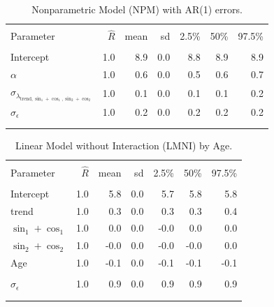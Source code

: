 \documentclass{article}\usepackage[]{graphicx}\usepackage[]{color}
\begin{document}
\begin{table}[bp!]
\caption{Nonparametric Model (NPM) with AR(1) errors.}
\label{npm_ar}
\centering
\begin{tabular}{lrrrrrr}
\\[-1.8ex]\hline 
\hline \\[-1.8ex] 
Parameter & $\hat{R}$  & mean & sd & 2.5\% & 50\% & 97.5\% \\ 
\hline \\[-1.8ex] 
Intercept & 1.0 & 8.9 & 0.0 & 8.8 & 8.9 & 8.9 \\ 
$\alpha$ & 1.0 & 0.6 & 0.0 & 0.5 & 0.6 & 0.7 \\ 
$\sigma_{\lambda_{\text{trend}, \sin_{1}+\cos_{1}, \sin_{2}+\cos_{2}}}$ & 1.0 & 0.1 & 0.0 & 0.1 & 0.1 & 0.2 \\ 
$\sigma_{\epsilon}$  & 1.0 & 0.2 & 0.0 & 0.2 & 0.2 & 0.2 \\ 
\\[-1.8ex]\hline 
\hline \\[-1.8ex] 
\end{tabular}
\end{table}




\begin{table}[bp!]
\caption{Linear Model without Interaction (LMNI) by Age.}
\label{lmni_age}
\centering
\begin{tabular}{lrrrrrr}
\\[-1.8ex]\hline 
\hline \\[-1.8ex]
Parameter & $\hat{R}$  & mean & sd & 2.5\% & 50\% & 97.5\% \\ 
\hline \\[-1.8ex] 
Intercept & 1.0 & 5.8 & 0.0 & 5.7 & 5.8 & 5.8 \\ 
trend & 1.0 & 0.3 & 0.0 & 0.3 & 0.3 & 0.4 \\
$\sin_{1} + \cos_{1}$ & 1.0 & 0.0 & 0.0 & -0.0 & 0.0 & 0.0 \\ 
$\sin_{2} + \cos_{2}$ & 1.0 & -0.0 & 0.0 & -0.0 & -0.0 & 0.0 \\ 
Age & 1.0 & -0.1 & 0.0 & -0.1 & -0.1 & -0.1 \\ 
  \hline \\[-1.8ex] 
$\sigma_{\epsilon}$  & 1.0 & 0.9 & 0.0 & 0.9 & 0.9 & 0.9 \\ 
\\[-1.8ex]\hline 
\hline \\[-1.8ex] 
\end{tabular}
\end{table}
\end{document}
